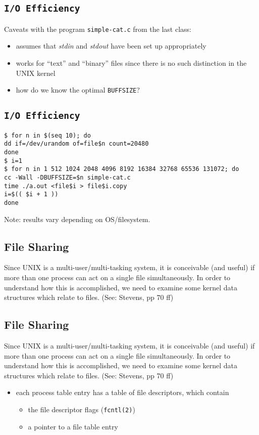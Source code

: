 \documentclass[xga]{xdvislides}
\begin{document}
\subsection{{\tt I/O Efficiency}}
Caveats with the program {\tt simple-cat.c} from the last class:
\begin{itemize}
	\item assumes that {\em stdin} and {\em stdout} have been set up
		appropriately
	\item works for ``text'' and ``binary'' files since there is no such
		distinction in the UNIX kernel
	\item how do we know the optimal {\tt BUFFSIZE}?
\end{itemize}

\subsection{{\tt I/O Efficiency}}
\begin{verbatim}
$ for n in $(seq 10); do
dd if=/dev/urandom of=file$n count=20480
done
$ i=1
$ for n in 1 512 1024 2048 4096 8192 16384 32768 65536 131072; do
cc -Wall -DBUFFSIZE=$n simple-cat.c
time ./a.out <file$i > file$i.copy
i=$(( $i + 1 ))
done

\end{verbatim}

Note: results vary depending on OS/filesystem.

\subsection{File Sharing}
Since UNIX is a multi-user/multi-tasking system, it is conceivable (and
useful) if more than one process can act on a single file simultaneously. In
order to understand how this is accomplished, we need to examine some kernel
data structures which relate to files.  (See: Stevens, pp 70 ff)

\subsection{File Sharing}
Since UNIX is a multi-user/multi-tasking system, it is conceivable (and
useful) if more than one process can act on a single file simultaneously. In
order to understand how this is accomplished, we need to examine some kernel
data structures which relate to files.  (See: Stevens, pp 70 ff)

\begin{itemize}
	\item each process table entry has a table of file descriptors, which contain
		\begin{itemize}
			\item the file descriptor flags (\verb+fcntl(2)+)
			\item a pointer to a file table entry
		\end{itemize}
\end{itemize}
\end{document}
